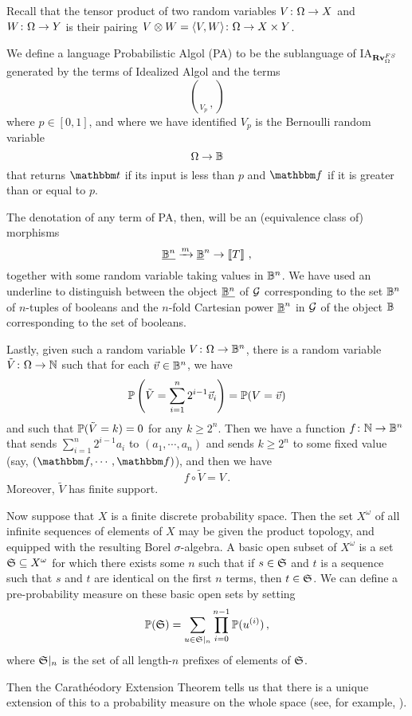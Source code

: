 \documentclass{report}[11pt]
\begin{document}
Recall that the tensor product of two random variables $V\from \Omega \to X$ and $W \from \Omega \to Y$ is their pairing $V \tensor W = \langle V,W\rangle \from \Omega \to X \times Y$.

We define a language Probabilistic Algol (PA) to be the sublanguage of IA${}_{\Rv_\Omega^{FS}}$ generated by the terms of Idealized Algol and the terms
\[
  \choose_{V_p}\,,
  \]
where $p\in [0,1]$, and where we have identified $V_p$ is the Bernoulli random variable
\[
  \Omega \to \bB
  \]
that returns $\true$ if its input is less than $p$ and $\false$ if it is greater than or equal to $p$.

The denotation of any term of PA, then, will be an (equivalence class of) morphisms
\[
  \ul{\bB^n} \xrightarrow{m} \ul{\bB}^n \to \deno{T}\,,
  \]
together with some random variable taking values in $\bB^n$.
We have used an underline to distinguish between the object $\ul{\bB^n}$ of $\G$ corresponding to the set $\bB^n$ of $n$-tuples of booleans and the $n$-fold Cartesian power $\ul{\bB}^n$ in $\G$ of the object $\bB$ corresponding to the set of booleans.

Lastly, given such a random variable $V\from\Omega \to \bB^n$, there is a random variable $\tilde{V} \from \Omega \to \bN$ such that for each $\vec{v}\in\bB^n$, we have
\[
  \bP\left(\tilde{V} = \sum_{i=1}^n 2^{i-1}\vec{v}_i\right) = \bP(V = \vec{v})
  \]
and such that $\bP(\tilde{V}=k)=0$ for any $k\ge 2^n$.
Then we have a function $f \from \bN \to \bB^n$ that sends $\sum_{i=1}^n 2^{i-1}a_i$ to $(a_1,\cdots,a_n)$ and sends $k\ge 2^n$ to some fixed value (say, $(\false,\cdots,\false)$), and then we have
\[
  f\circ\tilde{V}=V\,.
  \]
Moreover, $\tilde{V}$ has finite support.

Now suppose that $X$ is a finite discrete probability space.  
Then the set $X^\omega$ of all infinite sequences of elements of $X$ may be given the product topology, and equipped with the resulting Borel $\sigma$-algebra.  
A basic open subset of $X^\omega$ is a set $\S\subset X^\omega$ for which there exists some $n$ such that if $s\in \S$ and $t$ is a sequence such that $s$ and $t$ are identical on the first $n$ terms, then $t\in\S$.
We can define a pre-probability measure on these basic open sets by setting
\[
  \bP(\S) = \sum_{u\in \S\vert_n} \prod_{i=0}^{n-1} \bP(u^{(i)})\,,
  \]
where $\S\vert_n$ is the set of all length-$n$ prefixes of elements of $\S$.

Then the Carath\'{e}odory Extension Theorem tells us that there is a unique extension of this to a probability measure on the whole space (see, for example, \cite[1.1.4]{StochasticCalculusII}).
\end{document}
